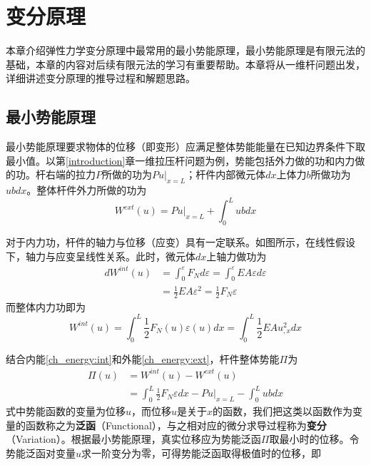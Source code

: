 \chapter{变分原理}
本章介绍弹性力学变分原理中最常用的最小势能原理，最小势能原理是有限元法的基础，本章的内容对后续有限元法的学习有重要帮助。本章将从一维杆问题出发，详细讲述变分原理的推导过程和解题思路。
\section{最小势能原理}
最小势能原理要求物体的位移（即变形）应满足整体势能能量在已知边界条件下取最小值。以第\ref{introduction}章一维拉压杆问题为例，势能包括外力做的功和内力做的功。杆右端的拉力$P$所做的功为$Pu\vert_{x=L}$；杆件内部微元体$dx$上体力$b$所做功为$ubdx$。整体杆件外力所做的功为
\begin{equation}\label{ch_energy:ext}
    W^{ext}(u) = P u\vert_{x=L} + \int_{0}^{L} u b dx
\end{equation}\par
对于内力功，杆件的轴力与位移（应变）具有一定联系。如图所示，在线性假设下，轴力与应变呈线性关系。此时，微元体$dx$上轴力做功为
\begin{equation}
\begin{split}
    dW^{int}(u) &= \int_0^\varepsilon F_N d\varepsilon = \int_0^\varepsilon EA\varepsilon d\varepsilon \\
                &=\frac{1}{2} EA \varepsilon^2 = \frac{1}{2} F_N \varepsilon
\end{split}
\end{equation}
而整体内力功即为
\begin{equation}\label{ch_energy:int}
W^{int}(u) = \int_0^L \frac{1}{2} F_N(u) \varepsilon(u) dx =  \int_0^L \frac{1}{2} EA u_{,x}^2 dx
\end{equation}\par
结合内能\eqref{ch_energy:int}和外能\eqref{ch_energy:ext}，杆件整体势能$\Pi$为
\begin{equation}
\begin{split}
    \Pi(u) &= W^{int}(u) - W^{ext}(u) \\
           &= \int_0^L \frac{1}{2}F_N\varepsilon dx - P u\vert_{x=L} - \int_{0}^{L} u b dx
\end{split}
\end{equation}
式中势能函数的变量为位移$u$，而位移$u$是关于$x$的函数，我们把这类以函数作为变量的函数称之为\textbf{泛函}（Functional），与之相对应的微分求导过程称为\textbf{变分}（Variation）。根据最小势能原理，真实位移应为势能泛函$\Pi$取最小时的位移。令势能泛函对变量$u$求一阶变分为零，可得势能泛函取得极值时的位移，即
